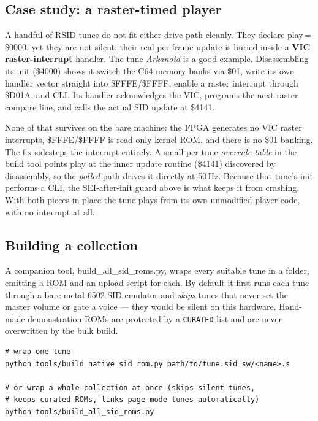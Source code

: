 \documentclass[11pt,a4paper]{article}
\newcommand{\reg}[1]{{\ttfamily #1}}
\begin{document}
\subsection{Case study: a raster-timed player}

A handful of RSID tunes do not fit either drive path cleanly. They
declare \reg{play\,=\,\$0000}, yet they are not silent: their real
per-frame update is buried inside a \textbf{VIC raster-interrupt} handler.
The tune \textit{Arkanoid} is a good example. Disassembling its
\reg{init} (\reg{\$4000}) shows it switch the C64
memory banks via \reg{\$01}, write its own handler vector straight into
\reg{\$FFFE/\$FFFF}, enable a raster interrupt through \reg{\$D01A}, and
\reg{CLI}. Its handler acknowledges the VIC, programs the next raster
compare line, and calls the actual SID update at \reg{\$4141}.

None of that survives on the bare machine: the FPGA generates no VIC
raster interrupts, \reg{\$FFFE/\$FFFF} is read-only kernel ROM, and there
is no \reg{\$01} banking. The fix sidesteps the interrupt entirely. A
small per-tune \emph{override table} in the build tool points \reg{play}
at the inner update routine (\reg{\$4141}) discovered by disassembly, so
the \emph{polled} path drives it directly at 50\,Hz. Because that tune's
\reg{init} performs a \reg{CLI}, the \reg{SEI}-after-\reg{init} guard
above is what keeps it from crashing. With both pieces in place the tune
plays from its own unmodified player code, with no interrupt at all.

\subsection{Building a collection}

A companion tool, \reg{build\_all\_sid\_roms.py}, wraps every suitable
tune in a folder, emitting a ROM and an upload script for each. By
default it first runs each tune through a bare-metal 6502 SID emulator and
\emph{skips} tunes that never set the master volume or gate a voice ---
they would be silent on this hardware. Hand-made demonstration ROMs are
protected by a \texttt{CURATED} list and are never overwritten by the
bulk build.

\begin{lstlisting}[style=term]
# wrap one tune
python tools/build_native_sid_rom.py path/to/tune.sid sw/<name>.s

# or wrap a whole collection at once (skips silent tunes,
# keeps curated ROMs, links page-mode tunes automatically)
python tools/build_all_sid_roms.py
\end{lstlisting}
\end{document}
